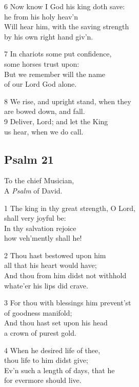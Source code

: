 6 Now know I God his king doth save:\\
he from his holy heav’n\\
Will hear him, with the saving strength\\
by his own right hand giv’n.

7 In chariots some put confidence,\\
some horses trust upon:\\
But we remember will the name\\
of our Lord God alone.

8 We rise, and upright stand, when they\\
are bowed down, and fall.\\
9 Deliver, Lord; and let the King\\
us hear, when we do call.

\begin{center}
\quad{}\quad{}
\end{center}

\subsection*{Psalm 21 }

To the chief Musician,\\
A \emph{Psalm} of David.

1 The king in thy great strength, O Lord,\\
shall very joyful be:\\
In thy salvation rejoice\\
how veh’mently shall he!

2 Thou hast bestowed upon him\\
all that his heart would have;\\
And thou from him didst not withhold\\
whate’er his lips did crave.

3 For thou with blessings him prevent’st\\
of goodness manifold;\\
And thou hast set upon his head\\
a crown of purest gold.

4 When he desired life of thee,\\
thou life to him didst give;\\
Ev’n such a length of days, that he\\
for evermore should live.

